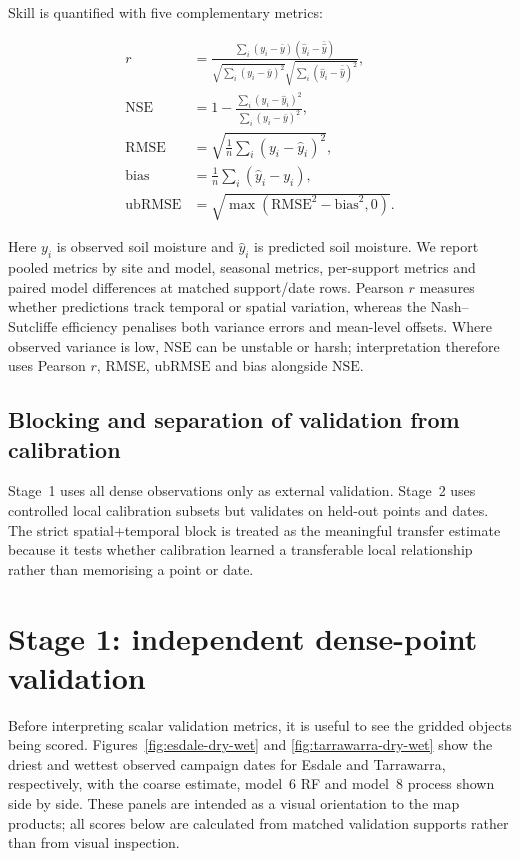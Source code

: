 \documentclass[11pt,a4paper]{article}
\newcommand{\nse}{\ensuremath{\mathrm{NSE}}}
\newcommand{\ubrmse}{\ensuremath{\mathrm{ubRMSE}}}
\newcommand{\pearsonr}{\ensuremath{r}}
\newcommand{\modelSix}{model~6 RF}
\newcommand{\modelEight}{model~8 process}
\begin{document}
Skill is quantified with five complementary metrics:

\begin{align}
\pearsonr &= \frac{\sum_i (y_i - \bar{y})(\hat{y}_i - \bar{\hat{y}})}
  {\sqrt{\sum_i (y_i - \bar{y})^2}\sqrt{\sum_i(\hat{y}_i - \bar{\hat{y}})^2}}, \\
\nse &= 1 - \frac{\sum_i (y_i - \hat{y}_i)^2}
               {\sum_i (y_i - \bar{y})^2}, \\
\mathrm{RMSE} &= \sqrt{\frac{1}{n}\sum_i (y_i - \hat{y}_i)^2}, \\
\mathrm{bias} &= \frac{1}{n}\sum_i(\hat{y}_i - y_i), \\
\ubrmse &= \sqrt{\max(\mathrm{RMSE}^2 - \mathrm{bias}^2, 0)}.
\end{align}

Here $y_i$ is observed soil moisture and $\hat{y}_i$ is predicted soil
moisture.  We report pooled metrics by site and model, seasonal metrics,
per-support metrics and paired model differences at matched support/date rows.
Pearson $\pearsonr$ measures whether predictions track temporal or spatial
variation, whereas the Nash--Sutcliffe efficiency \citep[\nse;][]{nash1970river}
penalises both variance errors and mean-level offsets.  Where observed variance
is low, \nse{} can be unstable or harsh; interpretation therefore uses Pearson
$\pearsonr$, RMSE, \ubrmse{} and bias alongside \nse{}.

\subsection{Blocking and separation of validation from calibration}
\label{sec:blocking}

Stage~1 uses all dense observations only as external validation.  Stage~2 uses
controlled local calibration subsets but validates on held-out points and dates.
The strict spatial+temporal block is treated as the meaningful transfer
estimate because it tests whether calibration learned a transferable local
relationship rather than memorising a point or date.

\section{Stage 1: independent dense-point validation}\label{sec:stage1}

Before interpreting scalar validation metrics, it is useful to see the gridded
objects being scored.  Figures~\ref{fig:esdale-dry-wet} and
\ref{fig:tarrawarra-dry-wet} show the driest and wettest observed campaign dates
for Esdale and Tarrawarra, respectively, with the coarse estimate, \modelSix{}
and \modelEight{} shown side by side.  These panels are intended as a visual
orientation to the map products; all scores below are calculated from matched
validation supports rather than from visual inspection.
\end{document}
